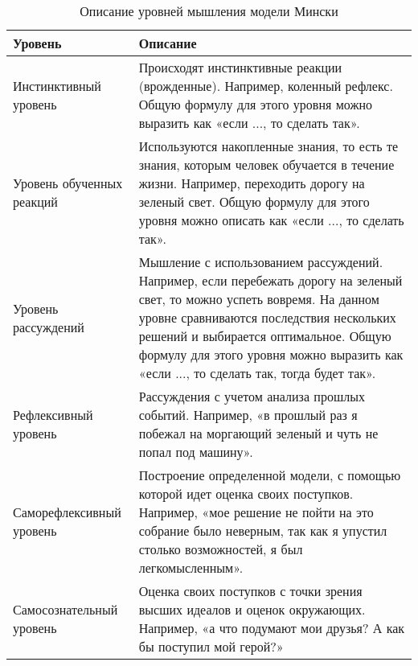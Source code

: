 \begin{table} [htbp]
  \centering
  \parbox{15cm}{\caption{Описание уровней мышления модели Мински}\label{ThinkingLevelDescription}}
  \begin{tabular}{| p{5cm} | p{11cm} |}
  
  \hline
\textbf{Уровень} & \textbf{Описание} \\
  \hline
  
Инстинктивный уровень & Происходят инстинктивные реакции (врожденные). Например, коленный рефлекс. Общую формулу для этого уровня можно выразить как «если ..., то сделать так». \\
  \hline

Уровень обученных реакций & Используются накопленные знания, то есть те знания, которым человек обучается в течение жизни. Например, переходить дорогу на зеленый свет. Общую формулу для этого уровня можно описать как «если ..., то сделать так». \\
  \hline

Уровень рассуждений & Мышление с использованием рассуждений. Например, если перебежать дорогу на зеленый свет, то можно успеть вовремя. На данном уровне сравниваются последствия нескольких решений и выбирается оптимальное. Общую формулу для этого уровня можно выразить как «если ..., то сделать так, тогда будет так». \\
  \hline

Рефлексивный уровень & Рассуждения с учетом анализа прошлых событий. Например, «в прошлый раз я побежал на моргающий зеленый и чуть не попал под машину». \\

  \hline
  Саморефлексивный уровень & Построение определенной модели, с помощью которой идет оценка своих поступков. Например, «мое решение не пойти на это собрание было неверным, так как я упустил столько возможностей, я был легкомысленным». \\
  \hline
  Самосознательный уровень & Оценка своих поступков с точки зрения высших идеалов и оценок окружающих. Например, «а что подумают мои друзья? А как бы поступил мой герой?» \\
  \hline
  
  \end{tabular}
\end{table}


